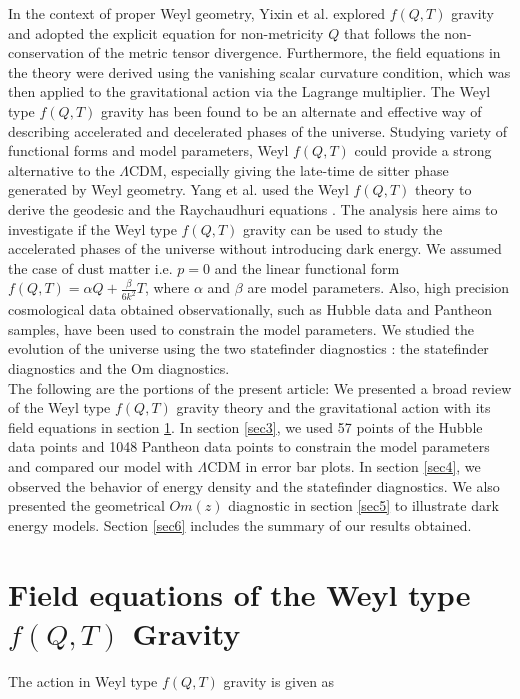 In the context of proper Weyl geometry, Yixin et al. \cite{Yixin/2020b} explored $f(Q, T)$ gravity and adopted the explicit equation for non-metricity $Q$ that follows the non-conservation of the metric tensor divergence. Furthermore, the field equations in the theory were derived using the vanishing scalar curvature condition, which was then applied to the gravitational action via the Lagrange multiplier. The Weyl type $f(Q,T)$ gravity has been found to be an alternate and effective way of describing accelerated and decelerated phases of the universe. Studying variety of functional forms and model parameters, Weyl $f(Q,T)$ could provide a strong alternative to the $\Lambda$CDM, especially giving the late-time de sitter phase generated by Weyl geometry. Yang et al. \cite{Yang/2021} used the Weyl $f(Q, T)$ theory to derive the geodesic and the Raychaudhuri equations .
The analysis here aims to investigate if the Weyl type $f(Q, T)$ gravity can be used to study the accelerated phases of the universe without introducing dark energy. We assumed the case of dust matter i.e. $p=0$ and the linear functional form $f(Q, T)= \alpha Q+ \frac{\beta}{6k^{2}} T$, where $\alpha$ and $\beta$ are model parameters. Also, high precision cosmological data obtained observationally, such as Hubble data and Pantheon samples, have been used to constrain the model parameters. We studied the evolution of the universe using the two statefinder diagnostics : the statefinder diagnostics and the Om diagnostics.\\
The following are the portions of the present article: We presented a broad review of the Weyl type $f(Q,T)$ gravity theory and the gravitational action with its field equations in section \ref{sec2}. In section \ref{sec3}, we used 57 points of the Hubble data points and 1048 Pantheon data points to constrain the model parameters and compared our model with $\Lambda$CDM in error bar plots. In section \ref{sec4}, we observed the behavior of energy density and the statefinder diagnostics. We also presented the geometrical $Om(z)$ diagnostic in section \ref{sec5} to illustrate dark energy models. Section \ref{sec6} includes the summary of our results obtained.

\section{Field equations of the Weyl type $f(Q,T)$ Gravity}\label{sec2}

The action in Weyl type $f(Q,T)$ gravity is given as \cite{Yixin/2020b}

